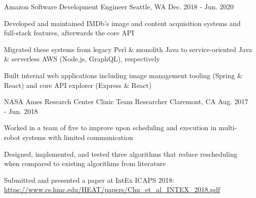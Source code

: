 

\begin{cventries}

  \cventry
    {Amazon} %
    {Software Development Engineer} %
    {Seattle, WA} %
    {Dec. 2018 - Jun. 2020} %
    {
      \begin{cvitems} %
        \item {Developed and maintained IMDb's image and content acquisition
        systems and full-stack features, afterwards the core API}
        \item {Migrated these systems from legacy Perl \& monolith Java to
        service-oriented Java \& serverless AWS (Node.js, GraphQL), respectively}
        \item {Built internal web applications including image management
        tooling (Spring \& React) and core API explorer (Express \& React)}
      \end{cvitems}
    }

  \cventry
    {NASA Ames Research Center} %
    {Clinic Team Researcher} %
    {Claremont, CA} %
    {Aug. 2017 - Jun. 2018} %
    {
      \begin{cvitems} %
        \item {Worked in a team of five to improve upon scheduling
        and execution in multi-robot systems with limited communication}
        \item {Designed, implemented, and tested three algorithms that reduce
        rescheduling when compared to existing algorithms from literature}
        \item {Submitted and presented a paper at IntEx ICAPS 2018:
        \url{https://www.cs.hmc.edu/HEAT/papers/Chu_et_al_INTEX_2018.pdf}}
      \end{cvitems}
    }



\end{cventries}
